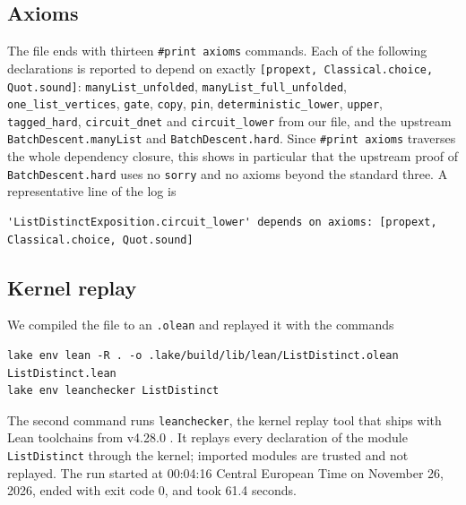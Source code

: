 \documentclass[11pt]{amsart}
\theoremstyle{definition}
\theoremstyle{remark}
\newcommand{\lean}[1]{\texttt{#1}}
\begin{document}
\subsection{Axioms}
The file ends with thirteen \lean{\#print axioms} commands. Each of the following declarations is reported to depend on exactly \lean{[propext, Classical.choice, Quot.sound]}:
\lean{manyList\_unfolded}, \lean{manyList\_full\_unfolded}, \lean{one\_list\_vertices}, \lean{gate}, \lean{copy}, \lean{pin}, \lean{deterministic\_lower}, \lean{upper}, \lean{tagged\_hard}, \lean{circuit\_dnet} and \lean{circuit\_lower} from our file, and the upstream \lean{BatchDescent.manyList} and \lean{BatchDescent.hard}. Since \lean{\#print axioms} traverses the whole dependency closure, this shows in particular that the upstream proof of \lean{BatchDescent.hard} uses no \lean{sorry} and no axioms beyond the standard three. A representative line of the log is
\begin{lstlisting}
'ListDistinctExposition.circuit_lower' depends on axioms: [propext, Classical.choice, Quot.sound]
\end{lstlisting}

\subsection{Kernel replay}\label{sec:replay}
We compiled the file to an \lean{.olean} and replayed it with the commands
\begin{lstlisting}
lake env lean -R . -o .lake/build/lib/lean/ListDistinct.olean ListDistinct.lean
lake env leanchecker ListDistinct
\end{lstlisting}
The second command runs \lean{leanchecker}, the kernel replay tool that ships with Lean toolchains from v4.28.0 \cite{lean4checker}. It replays every declaration of the module \lean{ListDistinct} through the kernel; imported modules are trusted and not replayed. The run started at 00:04:16 Central European Time on November 26, 2026, ended with exit code 0, and took 61.4 seconds.
\end{document}
